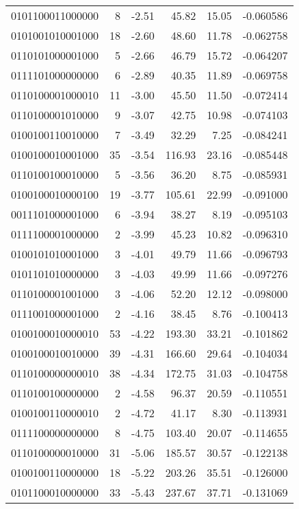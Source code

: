 \begin{tabular}{lrrrrr}
0101100011000000 &         8 &     -2.51 &    45.82 &    15.05 & -0.060586 \\
0101001010001000 &        18 &     -2.60 &    48.60 &    11.78 & -0.062758 \\
0110101000001000 &         5 &     -2.66 &    46.79 &    15.72 & -0.064207 \\
0111101000000000 &         6 &     -2.89 &    40.35 &    11.89 & -0.069758 \\
0110100001000010 &        11 &     -3.00 &    45.50 &    11.50 & -0.072414 \\
0110100001010000 &         9 &     -3.07 &    42.75 &    10.98 & -0.074103 \\
0100100110010000 &         7 &     -3.49 &    32.29 &     7.25 & -0.084241 \\
0100100010001000 &        35 &     -3.54 &   116.93 &    23.16 & -0.085448 \\
0110100100010000 &         5 &     -3.56 &    36.20 &     8.75 & -0.085931 \\
0100100010000100 &        19 &     -3.77 &   105.61 &    22.99 & -0.091000 \\
0011101000001000 &         6 &     -3.94 &    38.27 &     8.19 & -0.095103 \\
0111100001000000 &         2 &     -3.99 &    45.23 &    10.82 & -0.096310 \\
0100101010001000 &         3 &     -4.01 &    49.79 &    11.66 & -0.096793 \\
0101101010000000 &         3 &     -4.03 &    49.99 &    11.66 & -0.097276 \\
0110100001001000 &         3 &     -4.06 &    52.20 &    12.12 & -0.098000 \\
0111001000001000 &         2 &     -4.16 &    38.45 &     8.76 & -0.100413 \\
0100100010000010 &        53 &     -4.22 &   193.30 &    33.21 & -0.101862 \\
0100100010010000 &        39 &     -4.31 &   166.60 &    29.64 & -0.104034 \\
0110100000000010 &        38 &     -4.34 &   172.75 &    31.03 & -0.104758 \\
0110100100000000 &         2 &     -4.58 &    96.37 &    20.59 & -0.110551 \\
0100100110000010 &         2 &     -4.72 &    41.17 &     8.30 & -0.113931 \\
0111100000000000 &         8 &     -4.75 &   103.40 &    20.07 & -0.114655 \\
0110100000010000 &        31 &     -5.06 &   185.57 &    30.57 & -0.122138 \\
0100100110000000 &        18 &     -5.22 &   203.26 &    35.51 & -0.126000 \\
0101100010000000 &        33 &     -5.43 &   237.67 &    37.71 & -0.131069 \\
\bottomrule
\end{tabular}
